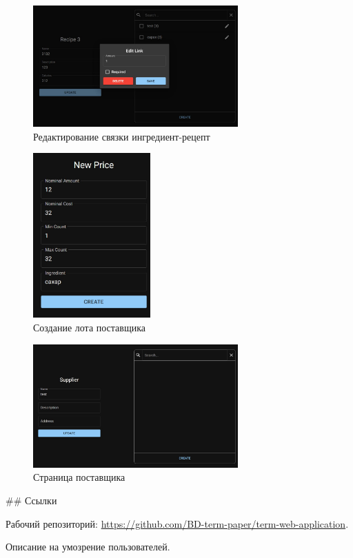 \begin{figure}[H]
  \centering
  \includegraphics[width=0.7\textwidth]{fig/project-7.jpg}
  \caption{Редактирование связки ингредиент-рецепт}
\end{figure}

\begin{figure}[H]
  \centering
  \includegraphics[width=0.4\textwidth]{fig/project-8.jpg}
  \caption{Создание лота поставщика}
\end{figure}

\begin{figure}[H]
  \centering
  \includegraphics[width=0.7\textwidth]{fig/project-9.jpg}
  \caption{Страница поставщика}
\end{figure}



\begin{markdown}
## Ссылки
\end{markdown}

\noindent Рабочий репозиторий: \url{https://github.com/BD-term-paper/term-web-application}.

\noindent Описание на умозрение пользователей.
